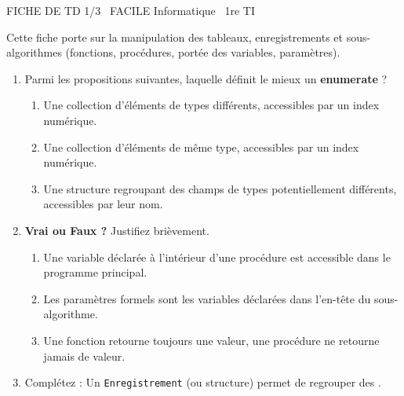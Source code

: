 \documentclass[11pt]{article}
\begin{document}
\begin{tcolorbox}[enhanced,colback=popink,colframe=popink,arc=10pt,boxrule=0pt,left=12pt,right=12pt,top=9pt,bottom=9pt]
{\color{white}\popxbold\small FICHE DE TD 1/3 \textbullet\ FACILE \hfill Informatique \textbullet\ 1re TI\par}
\end{tcolorbox}
\vspace{4pt}
Cette fiche porte sur la manipulation des tableaux, enregistrements et sous-algorithmes (fonctions, procédures, portée des variables, paramètres).

\begin{exercice}
\begin{enumerate}
    \item Parmi les propositions suivantes, laquelle définit le mieux un \textbf{enumerate} ?
    \begin{enumerate}
        \item Une collection d'éléments de types différents, accessibles par un index numérique.
        \item Une collection d'éléments de même type, accessibles par un index numérique.
        \item Une structure regroupant des champs de types potentiellement différents, accessibles par leur nom.
    \end{enumerate}
    \item \textbf{Vrai ou Faux ?} Justifiez brièvement.
    \begin{enumerate}
        \item Une variable déclarée à l'intérieur d'une procédure est accessible dans le programme principal.
        \item Les paramètres formels sont les variables déclarées dans l'en-tête du sous-algorithme.
        \item Une fonction retourne toujours une valeur, une procédure ne retourne jamais de valeur.
    \end{enumerate}
    \item Complétez : Un \texttt{Enregistrement} (ou structure) permet de regrouper des \underline{\hspace{4cm}}.
\end{enumerate}
\end{exercice}
\end{document}
